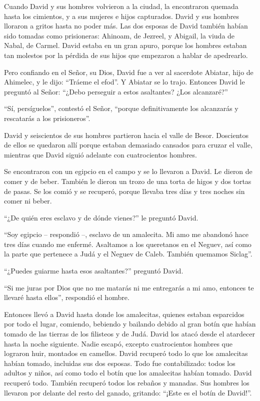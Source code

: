  Cuando David y sus hombres volvieron a la ciudad, la
encontraron quemada hasta los cimientos, y a sus mujeres e hijos
capturados.  David y sus hombres lloraron a gritos hasta no
poder más.  Las dos esposas de David también habían sido
tomadas como prisioneras: Ahinoam, de Jezreel, y Abigail, la viuda de
Nabal, de Carmel.  David estaba en un gran apuro, porque los
hombres estaban tan molestos por la pérdida de sus hijos que empezaron a
hablar de apedrearlo.

Pero confiando en el Señor, su Dios,  David fue a ver al
sacerdote Abiatar, hijo de Ahimelec, y le dijo: ``Tráeme el efod''. Y
Abiatar se lo trajo.  Entonces David le preguntó al Señor:
``¿Debo perseguir a estos asaltantes? ¿Los alcanzaré?''

``Sí, persíguelos'', contestó el Señor, ``porque definitivamente los
alcanzarás y rescatarás a los prisioneros''.

 David y seiscientos de sus hombres partieron hacia el valle
de Besor.  Doscientos de ellos se quedaron allí porque
estaban demasiado cansados para cruzar el valle, mientras que David
siguió adelante con cuatrocientos hombres.

 Se encontraron con un egipcio en el campo y se lo llevaron
a David. Le dieron de comer y de beber.  También le dieron
un trozo de una torta de higos y dos tortas de pasas. Se los comió y se
recuperó, porque llevaba tres días y tres noches sin comer ni beber.

 ``¿De quién eres esclavo y de dónde vienes?'' le preguntó
David.

``Soy egipcio -- respondió --, esclavo de un amalecita. Mi amo me
abandonó hace tres días cuando me enfermé.  Asaltamos a los
queretanos en el Neguev, así como la parte que pertenece a Judá y el
Neguev de Caleb. También quemamos Siclag''.

 ``¿Puedes guiarme hasta esos asaltantes?'' preguntó David.

``Si me juras por Dios que no me matarás ni me entregarás a mi amo,
entonces te llevaré hasta ellos'', respondió el hombre.

 Entonces llevó a David hasta donde los amalecitas, quienes
estaban esparcidos por todo el lugar, comiendo, bebiendo y bailando
debido al gran botín que habían tomado de las tierras de los filisteos y
de Judá.  David los atacó desde el atardecer hasta la noche
siguiente. Nadie escapó, excepto cuatrocientos hombres que lograron
huir, montados en camellos.  David recuperó todo lo que los
amalecitas habían tomado, incluidas sus dos esposas.  Todo
fue contabilizado: todos los adultos y niños, así como todo el botín que
los amalecitas habían tomado. David recuperó todo.  También
recuperó todos los rebaños y manadas. Sus hombres los llevaron por
delante del resto del ganado, gritando: ``¡Este es el botín de David!''.

